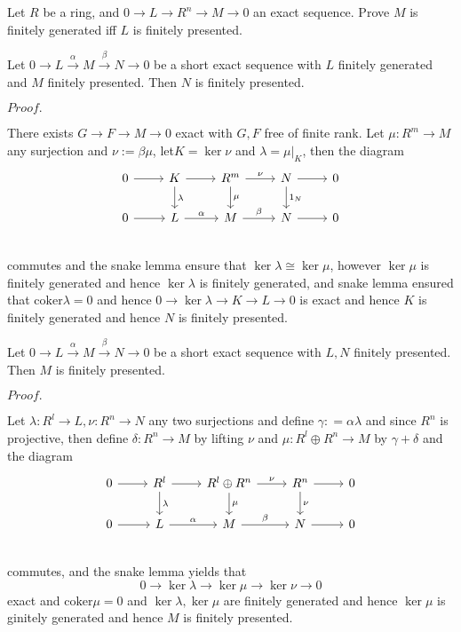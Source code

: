 \documentclass{article}
\newcommand{\Pf}[1]{$Proof.$\par}
\begin{document}
    \begin{proposition}
        Let $R$ be a ring, and $0\to L \to R^n\to M \to 0$ an exact sequence. Prove $M$ is finitely generated iff $L$ is finitely presented.    
    \end{proposition}
    
    \begin{proposition}
        Let $0\to L \overset{\alpha}{\to} M \overset{\beta}{\to} N \to 0$ be a short exact sequence with $L$ finitely generated and $M$ finitely presented. Then $N$ is finitely presented.
    \end{proposition}
    \Pf\par
        There exists $G\to F \to M \to 0$ exact with $G,F$ free of finite rank. Let $\mu:R^m \to M$ any surjection and $\nu:= \beta\mu$, let$K = \ker \nu$ and $\lambda = \mu|_K$, then the diagram
        \[
        \begin{tikzcd}
            0\arrow[r] & K\arrow[r]\arrow[d,"\lambda"] & R^m\arrow[r,"\nu"]\arrow[d,"\mu"] & N\arrow[r]\arrow[d,"1_N"] & 0 \\
            0\arrow[r] & L\arrow[r,"\alpha"] & M\arrow[r,"\beta"] & N\arrow[r] & 0 \\
        \end{tikzcd}
        \]
        commutes and the snake lemma ensure that $\ker\lambda \cong \ker\mu$, however $\ker\mu$ is finitely generated and hence $\ker\lambda$ is finitely generated, and snake lemma ensured that $\text{coker}\lambda = 0$ and hence $0\to \ker\lambda \to K \to L \to 0$ is exact and hence $K$ is finitely generated and hence $N$ is finitely presented.

    \begin{proposition}
        Let $0\to L \overset{\alpha}{\to} M \overset{\beta}{\to} N \to 0$ be a short exact sequence with $L,N$ finitely presented. Then $M$ is finitely presented.
    \end{proposition}
    \Pf\par
        Let $\lambda:R^l \to L, \nu:R^n \to N$ any two surjections and define $\gamma: = \alpha\lambda$ and since $R^n$ is projective, then define $\delta:R^n \to M$ by lifting $\nu$ and $\mu:R^l\oplus R^n \to M$ by $\gamma+\delta$ and the diagram
        \[
        \begin{tikzcd}
            0\arrow[r] & R^l\arrow[r]\arrow[d,"\lambda"] & R^l\oplus R^n\arrow[r,"\nu"]\arrow[d,"\mu"] & R^n\arrow[r]\arrow[d,"\nu"] & 0 \\
            0\arrow[r] & L\arrow[r,"\alpha"] & M\arrow[r,"\beta"] & N\arrow[r] & 0 \\
        \end{tikzcd}
        \]
        commutes, and the snake lemma yields that
        \[0\to \ker \lambda \to \ker\mu \to \ker\nu \to 0\]
        exact and $\text{coker}\mu = 0$ and $\ker\lambda,\ker\mu$ are finitely generated and hence $\ker \mu$ is ginitely generated and hence $M$ is finitely presented.
        
\end{document}
